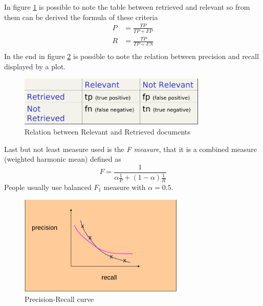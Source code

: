 In figure \ref{img:relevantMatrix} is possible to note the table between
retrieved and relevant so from them can be derived the formula
of these criteria
\begin{align*}
	P & = \frac{TP}{TP + FP} \\
	R & = \frac{TP}{TP + FN} \\
\end{align*}
In the end in figure \ref{img:imagePrecision} is possible to note
the relation between precision and recall displayed by a plot.

\begin{figure}
	\includegraphics[width=0.8\textwidth]{Images/relevantMatrix}
	\caption{Relation between Relevant and Retrieved documents}
	\label{img:relevantMatrix}
\end{figure}
Last but not least measure used is the \emph{F measure}, that it is 
a combined measure (weighted harmonic mean) defined as 
\[ F = \frac{1}{\alpha \frac{1}{P} + (1 - \alpha) \frac{1}{R}} \]
People usually use balanced $F_1$ measure with $\alpha = 0.5$.

\begin{figure}
	\includegraphics[width=0.7\textwidth]{Images/precisionCurve}
	\caption{Precision-Recall curve}
	\label{img:imagePrecision}
\end{figure}
